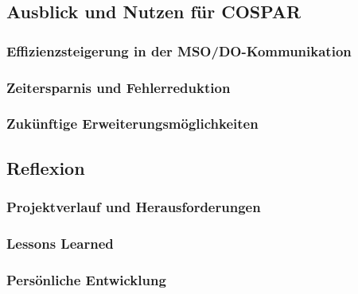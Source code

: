\documentclass[11pt,a4paper]{article}
\begin{document}
\subsection{Ausblick und Nutzen für COSPAR}

\subsubsection{Effizienzsteigerung in der MSO/DO-Kommunikation}

\subsubsection{Zeitersparnis und Fehlerreduktion}

\subsubsection{Zukünftige Erweiterungsmöglichkeiten}

\subsection{Reflexion}

\subsubsection{Projektverlauf und Herausforderungen}

\subsubsection{Lessons Learned}

\subsubsection{Persönliche Entwicklung}
\end{document}
